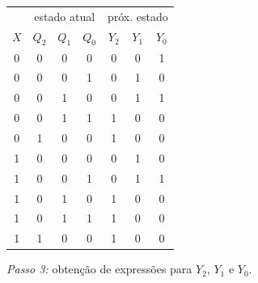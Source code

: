 \documentclass[a4paper,12pt,notitlepage]{article}
\def\passo#1{\vspace{1ex}\noindent{}\emph{Passo #1:}}
\begin{document}
\begin{center}
\begin{tabular}{c|c c c||c c c}
     & \multicolumn{3}{c||}{estado atual} & \multicolumn{3}{c}{próx. estado} \\
 $X$ & $Q_2$ & $Q_1$ & $Q_0$ & $Y_2$ & $Y_1$ & $Y_0$ \\
\hline
 0 & 0 & 0 & 0 & 0 & 0 & 1 \\
 0 & 0 & 0 & 1 & 0 & 1 & 0 \\
 0 & 0 & 1 & 0 & 0 & 1 & 1 \\
 0 & 0 & 1 & 1 & 1 & 0 & 0 \\
 0 & 1 & 0 & 0 & 1 & 0 & 0 \\
 1 & 0 & 0 & 0 & 0 & 1 & 0 \\
 1 & 0 & 0 & 1 & 0 & 1 & 1 \\
 1 & 0 & 1 & 0 & 1 & 0 & 0 \\
 1 & 0 & 1 & 1 & 1 & 0 & 0 \\
 1 & 1 & 0 & 0 & 1 & 0 & 0 \\
\end{tabular}
\end{center}

\passo{3} obtenção de expressões para $Y_2$, $Y_1$ e $Y_0$.
\end{document}
